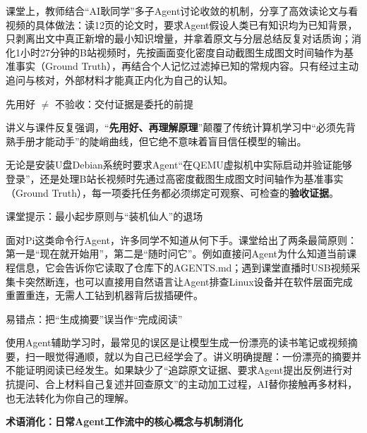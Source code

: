 \documentclass[UTF8,a4paper,11pt,fontset=fandol]{ctexart}
\begin{document}
课堂上，教师结合“AI耿同学”多子Agent讨论收敛的机制，分享了高效读论文与看视频的具体做法：读12页的论文时，要求Agent假设人类已有知识均为已知背景，只剥离出文中真正新增的最小知识增量，并拿着原文与分层总结反复对话质询；消化1小时27分钟的B站视频时，先按画面变化密度自动截图生成图文时间轴作为基准事实（Ground Truth），再结合个人记忆过滤掉已知的常规内容。只有经过主动追问与核对，外部材料才能真正内化为自己的认知。

\begin{importantbox}{先用好 \ensuremath{\ne} 不验收：交付证据是委托的前提}

讲义与课件反复强调，“\textbf{先用好、再理解原理}”颠覆了传统计算机学习中“必须先背熟手册才能动手”的陡峭曲线，但它绝不意味着盲目信任模型的输出。

无论是安装U盘Debian系统时要求Agent“在QEMU虚拟机中实际启动并验证能够登录”，还是处理B站长视频时先通过高密度截图生成图文时间轴作为基准事实（Ground Truth），每一项委托任务都必须绑定可观察、可检查的\textbf{验收证据}。

\end{importantbox}

\begin{knowledgebox}{课堂提示：最小起步原则与“装机仙人”的退场}

面对Pi这类命令行Agent，许多同学不知道从何下手。课堂给出了两条最简原则：第一是“现在就开始用”，第二是“随时问它”。例如直接问Agent为什么知道当前课程信息，它会告诉你它读取了仓库下的AGENTS.md；遇到课堂直播时USB视频采集卡突然断连，也可以直接用自然语言让Agent排查Linux设备并在软件层面完成重置重连，无需人工钻到机器背后拔插硬件。

\end{knowledgebox}

\begin{warningbox}{易错点：把“生成摘要”误当作“完成阅读”}

使用Agent辅助学习时，最常见的误区是让模型生成一份漂亮的读书笔记或视频摘要，扫一眼觉得通顺，就以为自己已经学会了。讲义明确提醒：一份漂亮的摘要并不能证明阅读已经发生。如果缺少了“追踪原文证据、要求Agent提出反例进行对抗提问、合上材料自己复述并回查原文”的主动加工过程，AI替你接触再多材料，也无法转化为你自己的理解。

\end{warningbox}

\par{}\textbf{术语消化：日常Agent工作流中的核心概念与机制消化}
\end{document}
